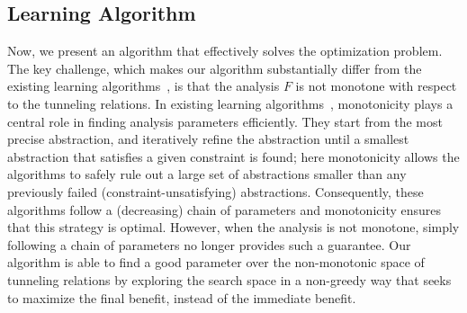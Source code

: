\subsection{Learning Algorithm}\label{tunneling:learning-algorithm}
Now, we present an algorithm that effectively solves the
optimization problem.  The key challenge, which makes our algorithm
substantially differ from the existing learning
algorithms~\cite{Liang2011learning,JeJeChOh17}, is that the analysis
$F$ is not monotone with respect to the tunneling relations.  In
existing learning algorithms~\cite{Liang2011learning,JeJeChOh17},
monotonicity plays a central role in finding analysis parameters
efficiently. They start from the most precise abstraction, and
iteratively refine the abstraction until a smallest abstraction that
satisfies a given constraint is found; here monotonicity allows the
algorithms to safely rule out a large set of abstractions smaller than any
previously failed (constraint-unsatisfying)
abstractions. Consequently, these algorithms follow a (decreasing)
chain of parameters and monotonicity ensures that this strategy
is optimal. However,
when the analysis is not monotone, simply following a chain of
parameters no longer provides such a guarantee.
Our algorithm is able to find a
good parameter over the non-monotonic space of tunneling relations by
exploring the search space in a non-greedy way that seeks to
maximize the final benefit, instead of the immediate benefit.




